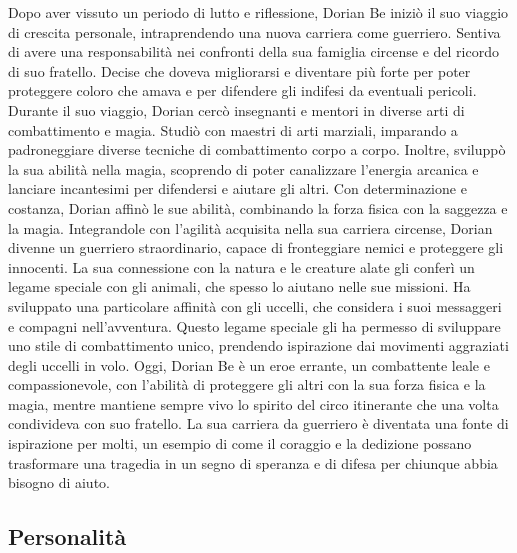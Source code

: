 Dopo aver vissuto un periodo di lutto e riflessione, Dorian Be iniziò il
suo viaggio di crescita personale, intraprendendo una nuova carriera
come guerriero. Sentiva di avere una responsabilità nei confronti della
sua famiglia circense e del ricordo di suo fratello. Decise che doveva
migliorarsi e diventare più forte per poter proteggere coloro che amava
e per difendere gli indifesi da eventuali pericoli. Durante il suo
viaggio, Dorian cercò insegnanti e mentori in diverse arti di
combattimento e magia. Studiò con maestri di arti marziali, imparando a
padroneggiare diverse tecniche di combattimento corpo a corpo. Inoltre,
sviluppò la sua abilità nella magia, scoprendo di poter canalizzare
l'energia arcanica e lanciare incantesimi per difendersi e aiutare gli
altri. Con determinazione e costanza, Dorian affinò le sue abilità,
combinando la forza fisica con la saggezza e la magia. Integrandole con
l'agilità acquisita nella sua carriera circense, Dorian divenne un
guerriero straordinario, capace di fronteggiare nemici e proteggere gli
innocenti. La sua connessione con la natura e le creature alate gli
conferì un legame speciale con gli animali, che spesso lo aiutano nelle
sue missioni. Ha sviluppato una particolare affinità con gli uccelli,
che considera i suoi messaggeri e compagni nell'avventura. Questo legame
speciale gli ha permesso di sviluppare uno stile di combattimento unico,
prendendo ispirazione dai movimenti aggraziati degli uccelli in volo.
Oggi, Dorian Be è un eroe errante, un combattente leale e
compassionevole, con l'abilità di proteggere gli altri con la sua forza
fisica e la magia, mentre mantiene sempre vivo lo spirito del circo
itinerante che una volta condivideva con suo fratello. La sua carriera
da guerriero è diventata una fonte di ispirazione per molti, un esempio
di come il coraggio e la dedizione possano trasformare una tragedia in
un segno di speranza e di difesa per chiunque abbia bisogno di aiuto.

\subsection{Personalità}\label{personalituxe0}


